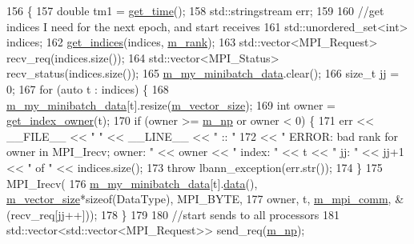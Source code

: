 \begin{DoxyCode}
156                                    \{
157   \textcolor{keywordtype}{double} tm1 = \hyperlink{namespacelbann_a478d36031ff0659893c4322cd856157f}{get\_time}();
158   std::stringstream err;
159 
160   \textcolor{comment}{//get indices I need for the next epoch, and start receives}
161   std::unordered\_set<int> indices;
162   \hyperlink{classlbann_1_1data__store__csv_ae0deaa88a2f5164569f796f7d35510d8}{get\_indices}(indices, \hyperlink{classlbann_1_1generic__data__store_a87695bfd2d1ed0dbe01d99108e3f68b7}{m\_rank});
163   std::vector<MPI\_Request> recv\_req(indices.size());
164   std::vector<MPI\_Status> recv\_status(indices.size());
165   \hyperlink{classlbann_1_1data__store__csv_a456bbbf6d09c1ec04cd6260cf11007d8}{m\_my\_minibatch\_data}.clear();
166   \textcolor{keywordtype}{size\_t} jj = 0;
167   \textcolor{keywordflow}{for} (\textcolor{keyword}{auto} t : indices) \{
168     \hyperlink{classlbann_1_1data__store__csv_a456bbbf6d09c1ec04cd6260cf11007d8}{m\_my\_minibatch\_data}[t].resize(\hyperlink{classlbann_1_1data__store__csv_acf75e96923877e10c8ed499ec48f9320}{m\_vector\_size});
169     \textcolor{keywordtype}{int} owner = \hyperlink{classlbann_1_1generic__data__store_ad0de5ac2cdcf3f692acb252a019a2aed}{get\_index\_owner}(t);
170     \textcolor{keywordflow}{if} (owner >= \hyperlink{classlbann_1_1generic__data__store_afcd4f99959c265c8c03dcf8ad3779d85}{m\_np} or owner < 0) \{
171       err << \_\_FILE\_\_ << \textcolor{stringliteral}{" "} << \_\_LINE\_\_ << \textcolor{stringliteral}{" :: "}
172           << \textcolor{stringliteral}{" ERROR: bad rank for owner in MPI\_Irecv; owner: "} << owner << \textcolor{stringliteral}{" index: "} << t << \textcolor{stringliteral}{" jj: "} << 
      jj+1 << \textcolor{stringliteral}{" of "} << indices.size();
173       \textcolor{keywordflow}{throw} lbann\_exception(err.str());
174     \}
175     MPI\_Irecv(
176       \hyperlink{classlbann_1_1data__store__csv_a456bbbf6d09c1ec04cd6260cf11007d8}{m\_my\_minibatch\_data}[t].\hyperlink{namespacelbann_1_1cnpy__utils_a9ac86d96ccb1f8b4b2ea16441738781f}{data}(), \hyperlink{classlbann_1_1data__store__csv_acf75e96923877e10c8ed499ec48f9320}{m\_vector\_size}*\textcolor{keyword}{sizeof}(DataType),  
      MPI\_BYTE,
177       owner, t, \hyperlink{classlbann_1_1generic__data__store_ae2d2d61d5d766a7f525eedcb05e0dbf6}{m\_mpi\_comm}, &(recv\_req[jj++]));
178   \}
179 
180   \textcolor{comment}{//start sends to all processors}
181   std::vector<std::vector<MPI\_Request>> send\_req(\hyperlink{classlbann_1_1generic__data__store_afcd4f99959c265c8c03dcf8ad3779d85}{m\_np});

\end{DoxyCode}
